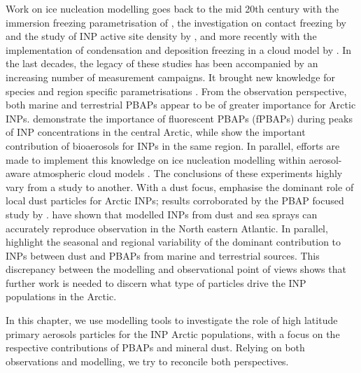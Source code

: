     Work on ice nucleation modelling goes back to the mid 20th century with the immersion freezing parametrisation of \citet{bigg_formation_1953}, the investigation on contact freezing by \citet{young_role_1974} and the study of INP active site density by \citet{fletcher_active_1969}, and more recently with the implementation of condensation and deposition freezing in a cloud model by \citet{meyers_new_1992}.
    In the last decades, the legacy of these studies has been accompanied by an increasing number of measurement campaigns. It brought new knowledge for species and region specific parametrisations \citep[e.g.][]{demott_predicting_2010, hoose_classical-theory-based_2010, niemand_particle-surface-area-based_2012, burrows_ice_2013, demott_integrating_2015, wilson_marine_2015, li_predicting_2022, gjelsvik_using_2025}.
    From the observation perspective, both marine and terrestrial PBAPs appear to be of greater importance for Arctic INPs. 
    \citet{kojoj_arctic_2024} demonstrate the importance of fluorescent PBAPs (fPBAPs) during peaks of INP concentrations in the central Arctic, while \citet{barry_bioaerosols_2025} show the important contribution of bioaerosols for INPs in the same region.
    In parallel, efforts are made to implement this knowledge on ice nucleation modelling within aerosol-aware atmospheric cloud models \citep[][]{gettelman_global_2010, hummel_simulating_2018, li_predicting_2022, kawai_dominant_2023, gjelsvik_using_2025}.
    The conclusions of these experiments highly vary from a study to another.
    With a dust focus, \citet{kawai_dominant_2023} emphasise the dominant role of local dust particles for Arctic INPs; results corroborated by the PBAP focused study by \citet{hummel_simulating_2018}. \citet{mccluskey_numerical_2019} have shown that modelled INPs from dust and sea sprays can accurately reproduce observation in the North eastern Atlantic.
    In parallel, \citet{chatziparaschos_assessing_2025} highlight the seasonal and regional variability of the dominant contribution to INPs between dust and PBAPs from marine and terrestrial sources.
    This discrepancy between the modelling and observational point of views shows that further work is needed to discern what type of particles drive the INP populations in the Arctic. 
    
In this chapter, we use modelling tools to investigate the role of high latitude primary aerosols particles for the INP Arctic populations, with a focus on the respective contributions of PBAPs and mineral dust. Relying on both observations and modelling, we try to reconcile both perspectives.
    
